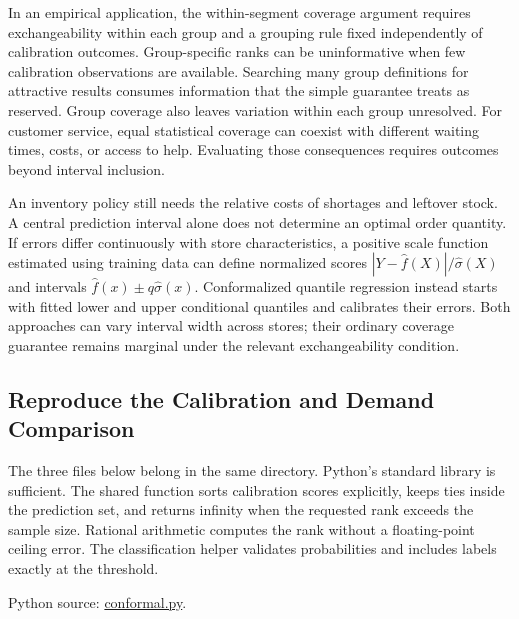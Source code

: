 In an empirical application, the within-segment coverage argument
requires exchangeability within each group and a grouping rule fixed
independently of calibration outcomes. Group-specific ranks can be
uninformative when few calibration observations are available. Searching
many group definitions for attractive results consumes information that
the simple guarantee treats as reserved. Group coverage also leaves
variation within each group unresolved. For customer service, equal
statistical coverage can coexist with different waiting times, costs, or
access to help. Evaluating those consequences requires outcomes beyond
interval inclusion.

An inventory policy still needs the relative costs of shortages and
leftover stock. A central prediction interval alone does not determine
an optimal order quantity. If errors differ continuously with store
characteristics, a positive scale function estimated using training data
can define normalized scores \(|Y-\widehat f(X)|/\widehat\sigma(X)\) and
intervals \(\widehat f(x)\pm q\widehat\sigma(x)\). Conformalized
quantile regression instead starts with fitted lower and upper
conditional quantiles and calibrates their errors. Both approaches can
vary interval width across stores; their ordinary coverage guarantee
remains marginal under the relevant exchangeability condition.

\FloatBarrier

\hypertarget{M07-reproduce-the-calibration-and-demand-comparison}{%
\subsection{Reproduce the Calibration and Demand
Comparison}\label{M07-reproduce-the-calibration-and-demand-comparison}}

\noindent \noindent The three files below belong in the same directory. Python's
standard library is sufficient. The shared function sorts calibration
scores explicitly, keeps ties inside the prediction set, and returns
infinity when the requested rank exceeds the sample size. Rational
arithmetic computes the rank without a floating-point ceiling error. The
classification helper validates probabilities and includes labels
exactly at the threshold.

\FloatBarrier
{}
Python source:
\href{../03_Data_and_Code/Conformal_Prediction/conformal.py}{conformal.py}.

